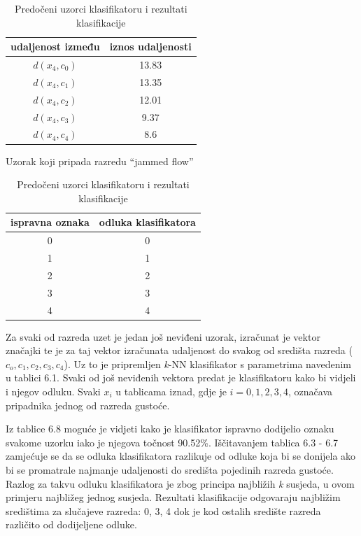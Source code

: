 \documentclass[times, utf8, zavrsni, numeric]{fer}
\begin{document}
\vspace{-1.5em}
\begin{table}[!ht]
\parbox{.45\linewidth}{
\centering
\begin{tabular}{c|c}
udaljenost između & iznos udaljenosti \\
\hline
\(d(x_4, c_0)\) & 13.83 \\
\(d(x_4, c_1)\) & 13.35 \\
\(d(x_4, c_2)\) & 12.01 \\
\(d(x_4, c_3)\) & 9.37 \\
\(d(x_4, c_4)\) & 8.6 \\
\end{tabular}
\caption{Uzorak koji pripada razredu \enquote{jammed flow}}
}
\hfill
\parbox{.45\linewidth}{
\centering
\begin{tabular}{c|c}
ispravna oznaka & odluka klasifikatora \\
\hline
0 & 0 \\
1 & 1 \\
2 & 2 \\
3 & 3 \\
4 & 4 \\
\end{tabular}
\caption{Predočeni uzorci klasifikatoru i rezultati klasifikacije}
}
\end{table}

Za svaki od razreda uzet je jedan još neviđeni uzorak, izračunat je vektor značajki te je  za taj vektor
 izračunata udaljenost do svakog od središta razreda (\(c_o, c_1, c_2, c_3, c_4\)). Uz to je pripremljen 
\textit{k}-NN klasifikator s parametrima navedenim u tablici 6.1. Svaki od još neviđenih vektora
predat je klasifikatoru kako bi vidjeli i njegov odluku. Svaki \(x_i\) u tablicama iznad, gdje je \(i=0,1,2,3,4\),
označava pripadnika jednog od razreda gustoće.

\bigbreak

Iz tablice 6.8 moguće je vidjeti kako je klasifikator ispravno dodijelio oznaku svakome uzorku iako
je njegova točnost 90.52\%. Iščitavanjem tablica 6.3 - 6.7 zamjećuje se da se odluka klasifikatora
razlikuje od odluke koja bi se donijela ako bi se promatrale najmanje udaljenosti do središta pojedinih 
razreda gustoće. Razlog za takvu odluku klasifikatora je zbog principa najbližih \textit{k} 
susjeda, u ovom primjeru najbližeg jednog susjeda. Rezultati klasifikacije odgovaraju
najbližim središtima za slučajeve razreda: 0, 3, 4 dok je kod ostalih središte razreda različito od
dodijeljene odluke. 
\end{document}
